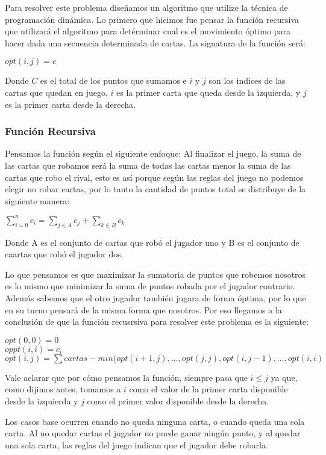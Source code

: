 Para resolver este problema diseñamos un algoritmo que utilize la técnica de programación dinámica. Lo primero que hicimos fue pensar la función recursiva que utilizará el algoritmo para detérminar cual es el movimiento óptimo para hacer dada una secuencia determinada de cartas. La signatura de la función será:

$opt(i,j) = c$

Donde $C$ es el total de los puntos que sumamos e $i$ y $j$ son los indices de las cartas que quedan en juego, $i$ es la primer carta que queda desde la izquierda, y $j$ es la primer carta desde la derecha.

\subsubsection{Función Recursiva}

Pensamos la función según el siguiente enfoque: Al finalizar el juego, la suma de las cartas que robamos será la suma de todas las cartas menos la suma de las cartas que robo el rival, esto es así porque según las reglas del juego no podemos elegir no robar cartas, por lo tanto la cantidad de puntos total se distribuye de la siguiente manera:

$\sum_{i=0}^{n} c_i = \sum_{j \in A} c_j + \sum_{k \in B} c_k$

Donde A es el conjunto de cartas que robó el jugador uno y B es el conjunto de caartas que robó el jugador dos.

Lo que pensamos es que maximizar la sumatoria de puntos que robemos nosotros es lo mismo que minimizar la suma de puntos robada por el jugador contrario. Además sabemos que el otro jugador también jugara de forma óptima, por lo que en su turno pensará de la misma forma que nosotros. Por eso llegamos a la conclusión de que la función recusrsiva para resolver este problema es la siguiente:

$opt(0,0) = 0$ \\
$oppt(i,i) = c_i$ \\
$opt(i,j) = \sum cartas - min(opt(i+1, j), ..., opt(j,j), opt(i, j-1), ... ,opt(i,i)$

Vale aclarar que por cómo pensamos la función, siempre pasa que $i \leq j$ ya que, como dijimos antes, tomamos a $i$ como el valor de la primer carta disponible desde la izquierda y $j$ como el primer valor disponible desde la derecha.

Los casos base ocurren cuando no queda ninguna carta, o cuando queda una sola carta. Al no quedar cartas el jugador no puede ganar ningún punto, y al quedar una sola carta, las reglas del juego indican que el jugador debe robarla.

